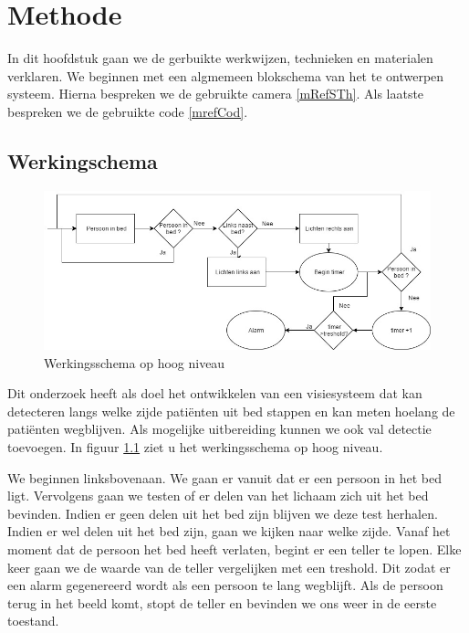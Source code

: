 \chapter{Methode}
In dit hoofdstuk gaan we de gerbuikte werkwijzen, technieken en materialen verklaren. We beginnen met een algmemeen blokschema van het te ontwerpen systeem. Hierna bespreken we de gebruikte camera \ref{mRefSTh}. Als laatste bespreken we de gebruikte code \ref{mrefCod}.

\section{Werkingschema}
\begin{figure}[h]
	\includegraphics[scale=0.5]{HoogNiveauBlokDiagram}
	\caption{Werkingsschema op hoog niveau}
	\label{imgWeS}
\end{figure}
Dit onderzoek heeft als doel het ontwikkelen van een visiesysteem dat kan detecteren langs welke zijde pati\"enten uit bed stappen en kan meten hoelang de pati\"enten wegblijven. Als mogelijke uitbereiding kunnen we ook val detectie toevoegen. In figuur \ref{imgWeS} ziet u het werkingsschema op hoog niveau.

We beginnen linksbovenaan. We gaan er vanuit dat er een persoon in het bed ligt. Vervolgens gaan we testen of er delen van het lichaam zich uit het bed bevinden. Indien er geen delen uit het bed zijn blijven we deze test herhalen. Indien er wel delen uit het bed zijn, gaan we kijken naar welke zijde. Vanaf het moment dat de persoon het bed heeft verlaten, begint er een teller te lopen. Elke keer gaan we de waarde van de teller vergelijken met een treshold. Dit zodat er een alarm gegenereerd wordt als een persoon te lang wegblijft. Als de persoon terug in het beeld komt, stopt de teller en bevinden we ons weer in de eerste toestand. 

